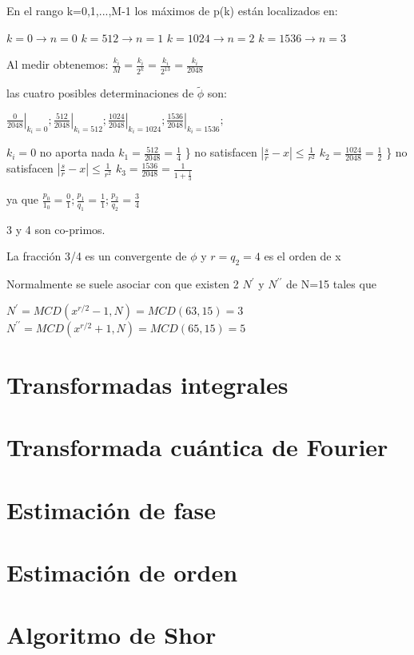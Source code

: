 En el rango k=0,1,...,M-1 los máximos de p(k) están localizados en:

$k=0 \rightarrow n=0$
$k=512 \rightarrow n=1$
$k=1024 \rightarrow n=2$
$k=1536 \rightarrow n=3$


Al medir obtenemos: $\frac{k_i}{M} = \frac{k_i}{2^k} = \frac{k_i}{2^{13}} = \frac{k_i}{2048}$

las cuatro posibles determinaciones de $\tilde{\phi}$ son:

$\left. \frac{0}{2048} \right|_{k_i=0}; \left. \frac{512}{2048} \right|_{k_i=512}; \left. \frac{1024}{2048} \right|_{k_i=1024}; \left. \frac{1536}{2048} \right|_{k_i=1536};$

$k_i = 0$ no aporta nada
$k_1 = \frac{512}{2048} = \frac{1}{4}$ \} no satisfacen $|\frac{s}{r} - x| \leq \frac{1}{r^2}$
$k_2 = \frac{1024}{2048} = \frac{1}{2}$ \} no satisfacen $|\frac{s}{r} - x| \leq \frac{1}{r^2}$
$k_3 = \frac{1536}{2048} = \frac{1}{1+\frac{1}{3}}$

ya que $\frac{p_0}{1_0} = \frac{0}{1}; \frac{p_1}{q_1} = \frac{1}{1}; \frac{p_2}{q_2} = \frac{3}{4}$

3 y 4 son co-primos.

La fracción 3/4 es un convergente de $\phi$ y $r = q_2 = 4$ es el orden de x

Normalmente se suele asociar con que existen 2 $N^\prime$ y $N^{\prime\prime}$ de N=15 tales que

$N^\prime = MCD(x^{r/2} - 1, N) = MCD(63, 15) = 3$
$N^{\prime\prime} = MCD(x^{r/2} + 1, N) = MCD(65, 15) = 5$























\section{Transformadas integrales}

\section{Transformada cuántica de Fourier}

\section{Estimación de fase}

\section{Estimación de orden}

\section{Algoritmo de Shor}


